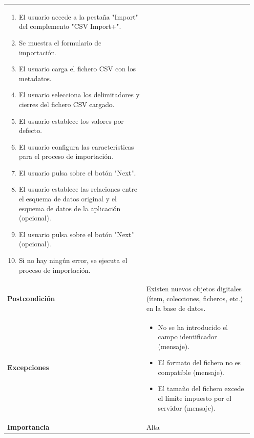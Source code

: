 \documentclass[
]{article}
\providecommand{\tightlist}{%
  \setlength{\itemsep}{0pt}\setlength{\parskip}{0pt}}
\begin{document}
\begin{longtable}[]{@{}ll@{}}
\begin{minipage}[t]{0.78\columnwidth}
\begin{enumerate}
\def\labelenumi{\arabic{enumi}.}
\tightlist
\item
  El usuario accede a la pestaña "Import" del complemento "CSV Import+".
\item
  Se muestra el formulario de importación.
\item
  El usuario carga el fichero CSV con los metadatos.
\item
  El usuario selecciona los delimitadores y cierres del fichero CSV
  cargado.
\item
  El usuario establece los valores por defecto.
\item
  El usuario configura las características para el proceso de
  importación.
\item
  El usuario pulsa sobre el botón "Next".
\item
  El usuario establece las relaciones entre el esquema de datos original
  y el esquema de datos de la aplicación (opcional).
\item
  El usuario pulsa sobre el botón "Next" (opcional).
\item
  Si no hay ningún error, se ejecuta el proceso de importación.
\end{enumerate}\strut
\end{minipage}\tabularnewline
\begin{minipage}[t]{0.16\columnwidth}\raggedright
\textbf{Postcondición}\strut
\end{minipage} & \begin{minipage}[t]{0.78\columnwidth}\raggedright
Existen nuevos objetos digitales (ítem, colecciones, ficheros, etc.) en
la base de datos.\strut
\end{minipage}\tabularnewline
\begin{minipage}[t]{0.16\columnwidth}\raggedright
\textbf{Excepciones}\strut
\end{minipage} & \begin{minipage}[t]{0.78\columnwidth}\raggedright
\begin{itemize}
\tightlist
\item
  No se ha introducido el campo identificador (mensaje).
\item
  El formato del fichero no es compatible (mensaje).
\item
  El tamaño del fichero excede el límite impuesto por el servidor
  (mensaje).
\end{itemize}\strut
\end{minipage}\tabularnewline
\begin{minipage}[t]{0.16\columnwidth}\raggedright
\textbf{Importancia}\strut
\end{minipage} & \begin{minipage}[t]{0.78\columnwidth}\raggedright
Alta\strut
\end{minipage}\tabularnewline
\bottomrule
\end{longtable}
\end{document}
